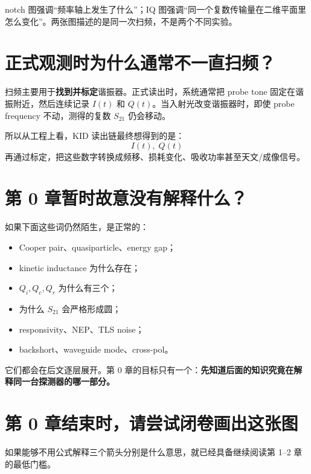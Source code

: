 \documentclass[11pt,a4paper,openany]{ctexrep}
\begin{document}
\begin{intuitionbox}
notch 图强调“频率轴上发生了什么”；IQ 图强调“同一个复数传输量在二维平面里怎么变化”。两张图描述的是同一次扫频，不是两个不同实验。
\end{intuitionbox}

\section{正式观测时为什么通常不一直扫频？}
扫频主要用于\textbf{找到并标定}谐振器。正式读出时，系统通常把 probe tone 固定在谐振附近，然后连续记录 $I(t)$ 和 $Q(t)$。当入射光改变谐振器时，即使 probe frequency 不动，测得的复数 $S_{21}$ 仍会移动。

所以从工程上看，KID 读出链最终想得到的是：
\[
\boxed{I(t),\;Q(t)}
\]
再通过标定，把这些数字转换成频移、损耗变化、吸收功率甚至天文/成像信号。

\section{第 0 章暂时故意没有解释什么？}
如果下面这些词仍然陌生，是正常的：
\begin{itemize}
  \item Cooper pair、quasiparticle、energy gap；
  \item kinetic inductance 为什么存在；
  \item $Q_i,Q_c,Q_r$ 为什么有三个；
  \item 为什么 $S_{21}$ 会严格形成圆；
  \item responsivity、NEP、TLS noise；
  \item backshort、waveguide mode、cross-pol。
\end{itemize}
它们都会在后文逐层展开。第 0 章的目标只有一个：\textbf{先知道后面的知识究竟在解释同一台探测器的哪一部分。}

\section{第 0 章结束时，请尝试闭卷画出这张图}
\begin{center}
\end{center}
如果能够不用公式解释三个箭头分别是什么意思，就已经具备继续阅读第 1--2 章的最低门槛。
\end{document}
